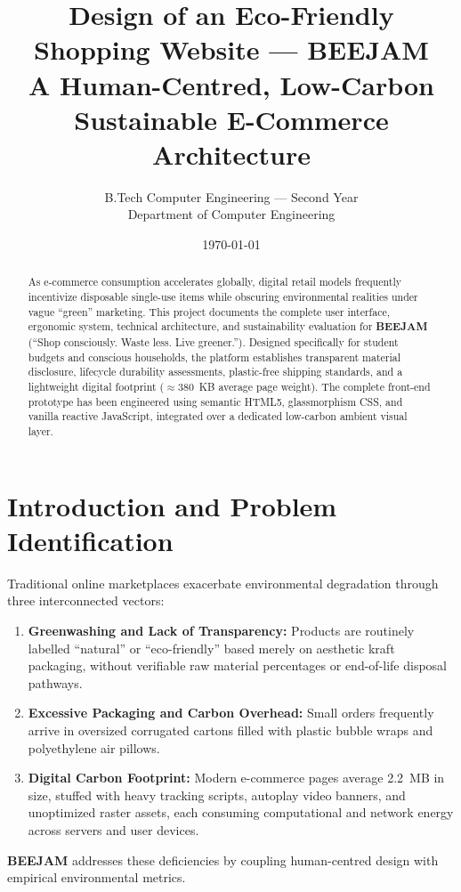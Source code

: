 \documentclass[11pt,a4paper]{article}
\title{\textbf{Design of an Eco-Friendly Shopping Website --- BEEJAM}\\\large A Human-Centred, Low-Carbon Sustainable E-Commerce Architecture}
\author{B.Tech Computer Engineering --- Second Year\\Department of Computer Engineering}
\date{\today}
\begin{document}
\maketitle

\begin{abstract}
As e-commerce consumption accelerates globally, digital retail models frequently incentivize disposable single-use items while obscuring environmental realities under vague ``green'' marketing. This project documents the complete user interface, ergonomic system, technical architecture, and sustainability evaluation for \textbf{BEEJAM} (``Shop consciously. Waste less. Live greener.''). Designed specifically for student budgets and conscious households, the platform establishes transparent material disclosure, lifecycle durability assessments, plastic-free shipping standards, and a lightweight digital footprint ($\approx$380~KB average page weight). The complete front-end prototype has been engineered using semantic HTML5, glassmorphism CSS, and vanilla reactive JavaScript, integrated over a dedicated low-carbon ambient visual layer.
\end{abstract}

\tableofcontents
\newpage

\section{Introduction and Problem Identification}
Traditional online marketplaces exacerbate environmental degradation through three interconnected vectors:
\begin{enumerate}
    \item \textbf{Greenwashing and Lack of Transparency:} Products are routinely labelled ``natural'' or ``eco-friendly'' based merely on aesthetic kraft packaging, without verifiable raw material percentages or end-of-life disposal pathways.
    \item \textbf{Excessive Packaging and Carbon Overhead:} Small orders frequently arrive in oversized corrugated cartons filled with plastic bubble wraps and polyethylene air pillows.
    \item \textbf{Digital Carbon Footprint:} Modern e-commerce pages average 2.2~MB in size, stuffed with heavy tracking scripts, autoplay video banners, and unoptimized raster assets, each consuming computational and network energy across servers and user devices.
\end{enumerate}
\textbf{BEEJAM} addresses these deficiencies by coupling human-centred design with empirical environmental metrics.
\end{document}

